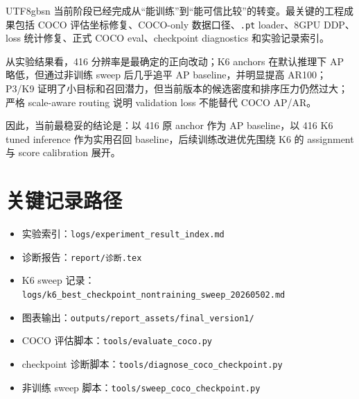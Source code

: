 \documentclass[11pt,a4paper]{article}
\begin{document}
\begin{CJK*}{UTF8}{gbsn}
当前阶段已经完成从“能训练”到“能可信比较”的转变。最关键的工程成果包括 COCO 评估坐标修复、COCO-only 数据口径、\texttt{.pt} loader、8GPU DDP、loss 统计修复、正式 COCO eval、checkpoint diagnostics 和实验记录索引。

从实验结果看，416 分辨率是最确定的正向改动；K6 anchors 在默认推理下 AP 略低，但通过非训练 sweep 后几乎追平 AP baseline，并明显提高 AR100；P3/K9 证明了小目标和召回潜力，但当前版本的候选密度和排序压力仍然过大；严格 scale-aware routing 说明 validation loss 不能替代 COCO AP/AR。

因此，当前最稳妥的结论是：以 416 原 anchor 作为 AP baseline，以 416 K6 tuned inference 作为实用召回 baseline，后续训练改进优先围绕 K6 的 assignment 与 score calibration 展开。

\appendix

\section{关键记录路径}

\begin{itemize}
  \item 实验索引：\texttt{logs/experiment\_result\_index.md}
  \item 诊断报告：\texttt{report/诊断.tex}
  \item K6 sweep 记录：\texttt{logs/k6\_best\_checkpoint\_nontraining\_sweep\_20260502.md}
  \item 图表输出：\texttt{outputs/report\_assets/final\_version1/}
  \item COCO 评估脚本：\texttt{tools/evaluate\_coco.py}
  \item checkpoint 诊断脚本：\texttt{tools/diagnose\_coco\_checkpoint.py}
  \item 非训练 sweep 脚本：\texttt{tools/sweep\_coco\_checkpoint.py}
\end{itemize}

\end{CJK*}
\end{document}
